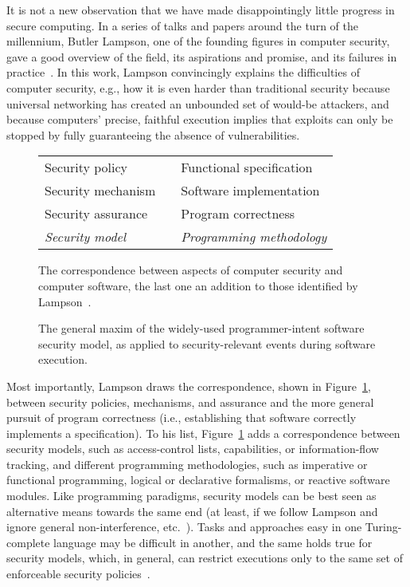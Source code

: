 \documentclass{IEEEtran}
\begin{document}
It is not a new observation that we have made disappointingly little progress in secure computing.  
In a series of talks and papers around the turn of the millennium, Butler Lampson, one of the founding figures in computer security, gave a good overview of the field, its aspirations and promise, and its failures in practice~\cite{LampsonRealWorld}.
In this work, 
Lampson convincingly explains the difficulties of computer security, e.g., how it is even harder than traditional security because universal networking has created an unbounded set of would-be attackers, and because computers’ precise, faithful execution implies that exploits can only be stopped by fully guaranteeing the absence of vulnerabilities.


\begin{figure}[t]
\centering
\begin{tabular}{lcl}
Security policy &  & Functional specification \\
Security mechanism &  & Software implementation \\
Security assurance &  & Program correctness \\
\emph{Security model} &  & \emph{Programming methodology}
\end{tabular}
\caption{The correspondence between aspects of computer security and computer software, the last one an addition to those identified by Lampson~\cite{LampsonRealWorld}.}\label{fig:terminology}
\end{figure}



\begin{figure*}[t]
\centering
{}
\caption{The general maxim of the widely-used programmer-intent software security model, as applied to security-relevant events during software execution.}\label{fig:piss}
\end{figure*}


Most importantly, Lampson draws the correspondence, shown in Figure~\ref{fig:terminology}, between security policies, mechanisms, and assurance and the more general pursuit of program correctness (i.e., establishing that software correctly implements a specification).
To his list, Figure~\ref{fig:terminology} adds a correspondence between security models, such as access-control lists, capabilities, or information-flow tracking, and different programming methodologies, such as imperative or functional programming, logical or declarative formalisms, or reactive software modules.
Like programming paradigms, 
security models can be best seen as alternative means towards the same end
(at least, if we follow Lampson and ignore general non-interference, etc.~\cite{hyperprop}).
Tasks and approaches easy in one Turing-complete language
may be difficult in another,
and the same holds true for security models,
which, in general,
can restrict executions only to the same set
of enforceable security policies~\cite{Enforceable}.
\end{document}
